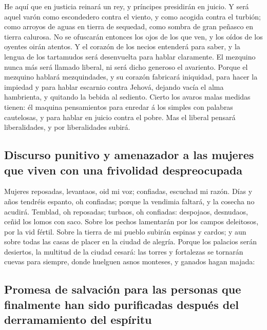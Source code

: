  He aquí que en justicia reinará un rey, y príncipes
presidirán en juicio.  Y será aquel varón como escondedero
contra el viento, y como acogida contra el turbión; como arroyos de
aguas en tierra de sequedad, como sombra de gran peñasco en tierra
calurosa.  No se ofuscarán entonces los ojos de los que
ven, y los oídos de los oyentes oirán atentos.  Y el
corazón de los necios entenderá para saber, y la lengua de los
tartamudos será desenvuelta para hablar claramente.  El
mezquino nunca más será llamado liberal, ni será dicho generoso el
avariento.  Porque el mezquino hablará mezquindades, y su
corazón fabricará iniquidad, para hacer la impiedad y para hablar
escarnio contra Jehová, dejando vacía el alma hambrienta, y quitando la
bebida al sediento.  Cierto los avaros malas medidas
tienen: él maquina pensamientos para enredar á los simples con palabras
cautelosas, y para hablar en juicio contra el pobre.  Mas
el liberal pensará liberalidades, y por liberalidades subirá.

\hypertarget{discurso-punitivo-y-amenazador-a-las-mujeres-que-viven-con-una-frivolidad-despreocupada}{%
\subsection{Discurso punitivo y amenazador a las mujeres que viven con
una frivolidad
despreocupada}\label{discurso-punitivo-y-amenazador-a-las-mujeres-que-viven-con-una-frivolidad-despreocupada}}

 Mujeres reposadas, levantaos, oid mi voz; confiadas,
escuchad mi razón.  Días y años tendréis espanto, oh
confiadas; porque la vendimia faltará, y la cosecha no acudirá.
 Temblad, oh reposadas; turbaos, oh confiadas: despojaos,
desnudaos, ceñid los lomos con saco.  Sobre los pechos
lamentarán por los campos deleitosos, por la vid fértil. 
Sobre la tierra de mi pueblo subirán espinas y cardos; y aun sobre todas
las casas de placer en la ciudad de alegría.  Porque los
palacios serán desiertos, la multitud de la ciudad cesará: las torres y
fortalezas se tornarán cuevas para siempre, donde huelguen asnos
monteses, y ganados hagan majada:

\hypertarget{promesa-de-salvaciuxf3n-para-las-personas-que-finalmente-han-sido-purificadas-despuuxe9s-del-derramamiento-del-espuxedritu}{%
\subsection{Promesa de salvación para las personas que finalmente han
sido purificadas después del derramamiento del
espíritu}\label{promesa-de-salvaciuxf3n-para-las-personas-que-finalmente-han-sido-purificadas-despuuxe9s-del-derramamiento-del-espuxedritu}}

